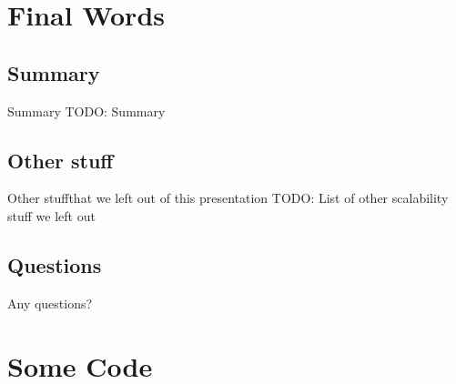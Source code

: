 \documentclass[utf8]{beamer}
\begin{document}
\section{Final Words}
\subsection{Summary}
\begin{frame}{Summary}
	TODO: Summary
\end{frame}
\subsection{Other stuff}
\begin{frame}{Other stuff}{that we left out of this presentation}
	TODO: List of other scalability stuff we left out
\end{frame}
\subsection{Questions}
\begin{frame}
	\alert{Any questions?}
\end{frame}

\appendix

\lstset{language=erlang}

\section{Some Code}
\begin{frame}
\mycode
\end{frame}
\end{document}
